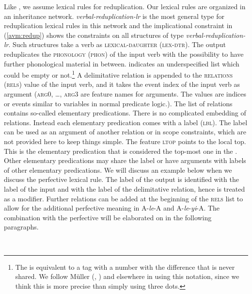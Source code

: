 Like \citet{FanSongBond2015}, we assume lexical rules for reduplication. Our lexical rules are
organized in an inheritance network. \textit{verbal-reduplication-lr} is the most general type for
reduplication lexical rules in this network and the implicational constraint in (\ref{avm:redup}) shows the constraints on all
structures of type \textit{verbal-reduplication-lr}. Such structures take a verb as
\textsc{lexical-daughter (lex-dtr)}.  The output reduplicates the \textsc{phonology (phon)} of the
input verb with the possibility to have further phonological material in between.  \etag{} indicates
an underspecified list which could be empty or not.\footnote{%
The \etag is equivalent to a tag with a number with the difference that \etag is never shared. We
follow Müller (\citeyear[161]{Mueller2002b}, \citeyear[294]{Mueller2003e}) and elsewhere in using this
notation, since we think this is more
precise than simply using three dots.}
A delimitative relation is appended to the
\textsc{relations (rels)} value of the input verb, and it takes the event index of the input verb  as
argument (\textsc{arg0}, \ldots, \textsc{arg3} are feature names for arguments. The values are
indices or events similar to variables in normal predicate logic.). The list of relations contains so-called elementary predications. There is no complicated
embedding of relations. Instead each elementary predication comes with a label (\textsc{lbl}). The
label can be used as an argument of another relation or in scope constraints, which are not provided
here to keep things simple. The feature \textsc{ltop} points to the local top. This is the
elementary predication that is considered the top-most one in the \relsl. Other elementary
predications may share the label or have arguments with labels of other elementary predications. We
will discuss an example below when we discuss the perfective lexical rule.
The label of the output  is identified with the label of the input and with the
label of the delimitative relation, hence  is treated as a modifier.  Further
relations can be added at the beginning of the \textsc{rels} list to allow for the additional
perfective meaning in A-\textit{le}-A and A-\textit{le}-\textit{yi}-A.  The combination with the
perfective will be elaborated on in the following paragraphs.

\eas
{} \impl\\
\label{avm:redup}
\zs

